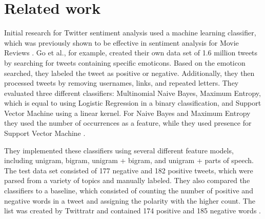 \chapter{Related work}
\label{cha:Chapter2_RelatedWork}
\iffalse

Length: 1-2 pages

Effort: ~2 weeks

2-3 Arbeiten maximal, die genauer betrachtet werden
Ruhig mehr Zitate --> aber nicht detailliert betrachten
Introduction to Data Mining --> zu generell, nur als Zitat
Hier nur im engsten Sinne


Content
\begin{itemize}
\item Alec Go, Richa Bhayani, and Lei Huang. 2009. Twitter Sentiment Classification Using Distant Supervision.
Technical Report. Standford.
\item Taboada or Serendio or Vader?
\item Khuc et al.
\end{itemize}

\fi
Initial research for Twitter sentiment analysis used a machine learning classifier, which was previously shown to be effective in sentiment analysis for Movie Reviews \cite{GoBHaHua2009}. Go et al., for example, created their own data set of 1.6 million tweets by searching for tweets containing specific emoticons. Based on the emoticon searched, they labeled the tweet as positive or negative. Additionally, they then processed tweets by removing usernames, links, and repeated letters. They evaluated three different classifiers: Multinomial Naive Bayes, Maximum Entropy, which is equal to using Logistic Regression in a binary classification, and Support Vector Machine using a linear kernel. For Naive Bayes and Maximum Entropy they used the number of occurrences as a feature, while they used presence for Support Vector Machine \cite{GoBHaHua2009}. 

They implemented these classifiers using several different feature models, including unigram, bigram, unigram + bigram, and unigram + parts of speech. The test data set consisted of 177 negative and 182 positive tweets, which were parsed from a variety of topics and manually labeled. They also compared the classifiers to a baseline, which consisted of counting the number of positive and negative words in a tweet and assigning the polarity with the higher count. The list was created by Twittratr and contained 174 positive and 185 negative words \cite{GoBHaHua2009}. 

